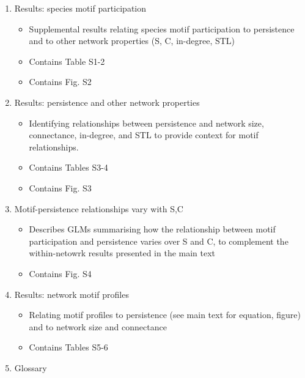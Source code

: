 \documentclass[12pt]{article}
\begin{document}
\begin{spacing}{2.0}
{\begin{spacing}{1.0}
\begin{enumerate}
        \item Results: species motif participation 
            \begin{itemize}
                \item Supplemental results relating species motif participation to persistence and to other network properties (S, C, in-degree, STL)
                \item Contains Table S1-2
                \item Contains Fig. S2
            \end{itemize}

    
        \item Results: persistence and other network properties

            \begin{itemize}
                \item Identifying relationships between persistence and network size, connectance, in-degree, and STL to provide context for motif relationships.
                \item Contains Tables S3-4
                \item Contains Fig. S3
            \end{itemize}    

        \item Motif-persistence relationships vary with S,C

            \begin{itemize}
                \item Describes GLMs summarising how the relationship between motif participation and persistence varies over S and C, to complement the within-netowrk results presented in the main text
                \item Contains Fig. S4
            \end{itemize}    
    
        \item Results: network motif profiles

            \begin{itemize}
                \item Relating motif profiles to persistence (see main text for equation, figure) and to network size and connectance
                \item Contains Tables S5-6
            \end{itemize}


        \item Glossary    


\end{enumerate}
\end{spacing}}
\end{spacing}
\end{document}
